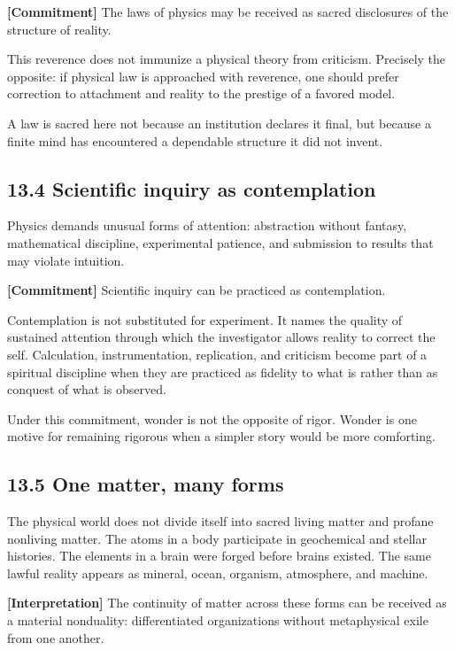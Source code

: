 \documentclass[
  11pt,
]{article}
\begin{document}
\textbf{{[}Commitment{]}} The laws of physics may be received as sacred
disclosures of the structure of reality.

This reverence does not immunize a physical theory from criticism.
Precisely the opposite: if physical law is approached with reverence,
one should prefer correction to attachment and reality to the prestige
of a favored model.

A law is sacred here not because an institution declares it final, but
because a finite mind has encountered a dependable structure it did not
invent.

\subsection{13.4 Scientific inquiry as
contemplation}\label{scientific-inquiry-as-contemplation}

Physics demands unusual forms of attention: abstraction without fantasy,
mathematical discipline, experimental patience, and submission to
results that may violate intuition.

\textbf{{[}Commitment{]}} Scientific inquiry can be practiced as
contemplation.

Contemplation is not substituted for experiment. It names the quality of
sustained attention through which the investigator allows reality to
correct the self. Calculation, instrumentation, replication, and
criticism become part of a spiritual discipline when they are practiced
as fidelity to what is rather than as conquest of what is observed.

Under this commitment, wonder is not the opposite of rigor. Wonder is
one motive for remaining rigorous when a simpler story would be more
comforting.

\subsection{13.5 One matter, many forms}\label{one-matter-many-forms}

The physical world does not divide itself into sacred living matter and
profane nonliving matter. The atoms in a body participate in geochemical
and stellar histories. The elements in a brain were forged before brains
existed. The same lawful reality appears as mineral, ocean, organism,
atmosphere, and machine.

\textbf{{[}Interpretation{]}} The continuity of matter across these
forms can be received as a material nonduality: differentiated
organizations without metaphysical exile from one another.
\end{document}
